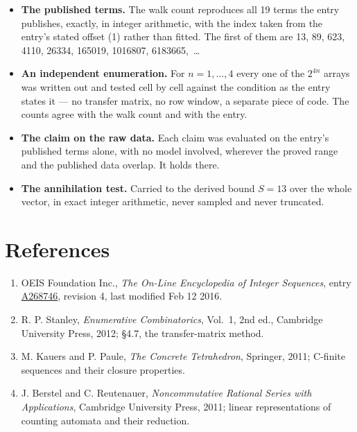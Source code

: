 \documentclass[11pt]{article}
\theoremstyle{definition}
\begin{document}
\begin{itemize}

\item {\bfseries The published terms.} The walk count reproduces all 19 terms the entry publishes, exactly, in integer arithmetic, with the index taken from the entry's stated offset (1) rather than fitted. The first of them are 13, 89, 623, 4110, 26334, 165019, 1016807, 6183665,~\dots

\item {\bfseries An independent enumeration.} For $n = 1,\dots,4$ every one of the $2^{4n}$ arrays was written out and tested cell by cell against the condition as the entry states it --- no transfer matrix, no row window, a separate piece of code. The counts agree with the walk count and with the entry.

\item {\bfseries The claim on the raw data.} Each claim was evaluated on the entry's published terms alone, with no model involved, wherever the proved range and the published data overlap. It holds there.

\item {\bfseries The annihilation test.} Carried to the derived bound $S = 13$ over the whole vector, in exact integer arithmetic, never sampled and never truncated.

\end{itemize}

\section{References}

\begin{enumerate}

\item OEIS Foundation Inc., \emph{The On-Line Encyclopedia of Integer Sequences}, entry \href{https://oeis.org/A268746}{A268746}, revision 4, last modified Feb 12 2016.

\item R. P. Stanley, \emph{Enumerative Combinatorics}, Vol.~1, 2nd ed., Cambridge University Press, 2012; \S4.7, the transfer-matrix method.

\item M. Kauers and P. Paule, \emph{The Concrete Tetrahedron}, Springer, 2011; C-finite sequences and their closure properties.

\item J. Berstel and C. Reutenauer, \emph{Noncommutative Rational Series with Applications}, Cambridge University Press, 2011; linear representations of counting automata and their reduction.

\end{enumerate}
\end{document}
